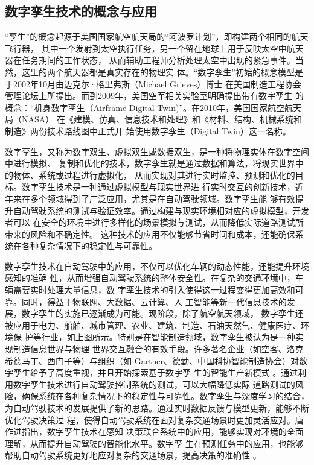 \subsection{数字孪生技术的概念与应用}

“孪生”的概念起源于美国国家航空航天局的“阿波罗计划”，即构建两个相同的航天飞行器，
其中一个发射到太空执行任务，另一个留在地球上用于反映太空中航天器在任务期间的工作状态，
从而辅助工程师分析处理太空中出现的紧急事件。当然，这里的两个航天器都是真实存在的物理实
体。“数字孪生”初始的概念模型是于2002年10月由迈克尔·格里弗斯（Michael Grieves）博士
在美国制造工程协会管理论坛上所提出。而到2009年，美国空军相关实验室明确提出带有数字孪生
的概念：“机身数字孪生（Airframe Digital Twin)”。在2010年，美国国家航空航天局（NASA）
在《建模、仿真、信息技术和处理》和《材料、结构、机械系统和制造》两份技术路线图中正式开
始使用数字孪生（Digital Twin）这一名称。

数字孪生，又称为数字双生、虚拟双生或数据双生，是一种将物理实体在数字空间中进行模拟、
复制和优化的技术，数字孪生就是通过数据和算法，将现实世界中的物体、系统或过程进行虚拟化，
从而实现对其进行实时监控、预测和优化的目标。数字孪生技术是一种通过虚拟模型与现实世界进
行实时交互的创新技术，近年来在多个领域得到了广泛应用，尤其是在自动驾驶领域。数字孪生能
够有效提升自动驾驶系统的测试与验证效率。通过构建与现实环境相对应的虚拟模型，开发者可以
在安全的环境中进行多样化的场景模拟与测试，从而降低实际道路测试所带来的风险和不确定性。
这种技术的应用不仅能够节省时间和成本，还能确保系统在各种复杂情况下的稳定性与可靠性。

数字孪生技术在自动驾驶中的应用，不仅可以优化车辆的动态性能，还能提升环境感知的准确
性，从而增强自动驾驶系统的整体安全性。在复杂的交通环境中，车辆需要实时处理大量信息，数
字孪生技术的引入使得这一过程变得更加高效和可靠。同时，得益于物联网、大数据、云计算、人
工智能等新一代信息技术的发展，数字孪生的实施已逐渐成为可能。现阶段，除了航空航天领域，
数字孪生还被应用于电力、船舶、城市管理、农业、建筑、制造、石油天然气、健康医疗、环境保
护等行业，如上图所示。特别是在智能制造领域，数字孪生被认为是一种实现制造信息世界与物理
世界交互融合的有效手段。许多著名企业（如空客、洛克希德马丁、西门子等）与组织（如
Gartner、德勤、中国科协智能制造协会）对数字孪生给予了高度重视，并且开始探索基于数字孪
生的智能生产新模式 。通过利用数字孪生技术进行自动驾驶控制系统的测试，可以大幅降低实际
道路测试的风险，确保系统在各种复杂情况下的稳定性与可靠性。数字孪生与深度学习的结合，
为自动驾驶技术的发展提供了新的思路。通过实时数据反馈与模型更新，能够不断优化驾驶决策过
程，使得自动驾驶系统在面对复杂交通场景时更加灵活应对。唐作进指出，数字孪生技术在感知
决策联合系统中的应用，能够实现对环境的全面理解，从而提升自动驾驶的智能化水平。数字孪
生在预测任务中的应用，也能够帮助自动驾驶系统更好地应对复杂的交通场景，提高决策的准确性
。

